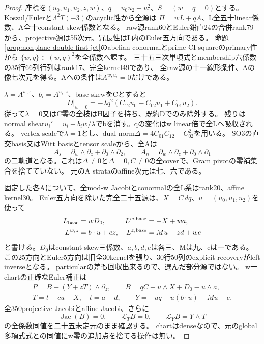 \documentclass[a4paper,11pt]{ltjsarticle}
\theoremstyle{definition}
\begin{document}
\begin{proof}
座標を$(u_0,u_1,u_2,z,w)$、$q=u_0u_2-u_1^2$、$S=(w=q=0)$とする。
Koszul/Eulerと$\Lambda^2T(-3)$のacyclic性から全源は
$\Pi=wL+qA$、L全五十linear係数、A全十constant skew係数となる。
raw源rank60とEuler鉛直24の合併rank79から、projective源は55次元、冗長性はL内のEuler五方向である。
命題\ref{prop:nonplane-double-first-jet}のabelian conormalとprime CI squareのprimary性から
$\{w,q\}\in(w,q)^2$を全係数へ課す。
三十五三次単項式とmembership六係数の35行66列行列はrank17、完全kernel49であり、
全raw源の十一線形条件、Aの像七次元を得る。Aへの条件は$A^{w,u_i}=0$だけである。

$\lambda=A^{w,z}$、$b_i=A^{u_i,z}$、base skewをCとすると
\[
 D|_{w=0}=-\lambda q^2(C_{12}u_0-C_{02}u_1+C_{01}u_2).
\]
従って$\lambda=0$又はC零の全枝はH因子を持ち、既約Dでのみ除外する。
残りはnormal shear$u_i'=u_i-b_iw/\lambda$でbを消す。qの変化はw linear倍で全Lへ吸収される。
vertex scaleで$\lambda=1$とし、dual norm$\Delta=4C_{01}C_{12}-C_{02}^2$を用いる。
SO3の直交basis又はWitt basisとtensor scaleから、全Aは
\[
 A_s=\partial_w\wedge\partial_z+\partial_0\wedge\partial_2,
 \qquad A_n=\partial_w\wedge\partial_z+\partial_0\wedge\partial_1
\]
の二軌道となる。これは$\Delta\ne0$と$\Delta=0,C\ne0$の全coverで、Gram pivotの零補集合を捨てていない。
元のA strataのaffine次元は七、六である。

固定した各Aについて、全mod-w Jacobiとconormalの全L系はrank20、affine kernel30。
Euler五方向を除いた完全二十五源は、$X=C\,dq$、$u=(u_0,u_1,u_2)$を使って
\[
\begin{aligned}
 L_{\rm base}&=wD_0,&L^{w,\rm base}&=-X+wa,\\
 L^{w,z}&=b\cdot u+cz,&L^{z,\rm base}&=Mu+zd+we
\end{aligned}
\]
と書ける。$D_0$はconstant skew三係数、$a,b,d,e$は各三、Mは九、cは一である。
この25方向とEuler5方向は旧全30kernelを張り、30行50列のexplicit recoveryがleft inverseとなる。
particularの差も回収出来るので、選んだ部分源ではない。
w一chartの正確なEuler補正は
\[
\begin{gathered}
 P=B+(Y+zT)\wedge\partial_z,\qquad
 B=qC+u\wedge X+D_0-u\wedge a,\\
 T=t-cu-X,\quad t=a-d,\qquad
 Y=-uq-u(b\cdot u)-Mu-e.
\end{gathered}
\]
全350projective Jacobiとaffine Jacobi、さらに
\[
 \operatorname{Jac}(B)=0,\qquad\mathcal L_TB=0,\qquad\mathcal L_YB=Y\wedge T
\]
の全係数同値を二十五未定元のまま確認する。
chartはdenseなので、元のglobal多項式式との同値にw零の追加点を捨てる操作は無い。


\end{proof}
\end{document}
